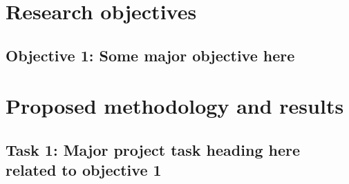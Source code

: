 
\section{Research objectives}                   %

\blindtext \cite{knuthwebsite}

\subsection*{Objective 1: Some major objective here}

\blindtext







\section{Proposed methodology and results}      %

\blindtext

\subsection{Task 1: Major project task heading here related to objective 1}

\blindtext


